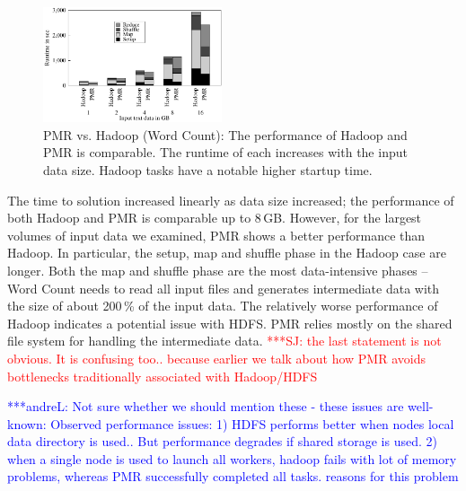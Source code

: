 \documentclass{acm_proc_article-sp}
\newcommand{\jhanote}[1]{ {\textcolor{red} { ***SJ: #1 }}}
\newcommand{\alnote}[1]{ {\textcolor{blue} { ***andreL: #1 }}}
\newcommand{\pnote}[1]{ {\textcolor{magenta} { ***pradeep: #1 }}}
\newcommand{\alnote}[1]{}
\newcommand{\pnote}[1]{}
\newcommand{\jhanote}[1]{}
\newcommand{\upp}{\vspace*{-0.5em}}
\begin{document}
\begin{figure}[ht]
	\centering
		\includegraphics[width=0.47\textwidth]{figures/wc_pmr_hmr.pdf}
                \caption{PMR vs. Hadoop (Word Count): The performance
                  of Hadoop and PMR is comparable. The runtime of each
                  increases with the input data size. Hadoop tasks
                  have a notable higher startup time.\upp}
\label{fig:figures_wc_pmr_hmr}
\end{figure}		
	
The time to solution increased linearly as data size increased; the
performance of both Hadoop and PMR is comparable up to 8\,GB. However,
for the largest volumes of input data we examined, PMR shows a better
performance than Hadoop. In particular, the setup, map and shuffle
phase in the Hadoop case are longer. Both the map and shuffle phase
are the most data-intensive phases -- Word Count needs to read all
input files and generates intermediate data with the size of about
200\,\% of the input data. The relatively worse performance of Hadoop
indicates a potential issue with HDFS. PMR relies mostly on the shared
file system for handling the intermediate data. \jhanote{the last
  statement is not obvious. It is confusing too.. because earlier we
  talk about how PMR avoids bottlenecks traditionally associated with
  Hadoop/HDFS}
  


\alnote{Not sure whether we should mention these - these issues are
  well-known: Observed performance issues: 1) HDFS performs better
  when nodes local data directory is used.. But performance degrades
  if shared storage is used.  2) when a single node is used to launch
  all workers, hadoop fails with lot of memory problems, whereas PMR
  successfully completed all tasks.  reasons for this problem}
\end{document}
